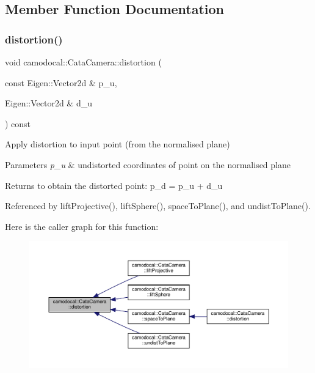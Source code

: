 \subsection{Member Function Documentation}
\mbox{\label{classcamodocal_1_1CataCamera_ade73e1a665f97d5a95d09f0fff19a3f7}} 
\subsubsection{\texorpdfstring{distortion()}{distortion()}\hspace{0.1cm}{\footnotesize\ttfamily [1/2]}}
{\footnotesize\ttfamily void camodocal\+::\+Cata\+Camera\+::distortion (\begin{DoxyParamCaption}\item[{const Eigen\+::\+Vector2d \&}]{p\+\_\+u,  }\item[{Eigen\+::\+Vector2d \&}]{d\+\_\+u }\end{DoxyParamCaption}) const}



Apply distortion to input point (from the normalised plane) 


\begin{DoxyParams}{Parameters}
{\em p\+\_\+u} & undistorted coordinates of point on the normalised plane \\
\hline
\end{DoxyParams}
\begin{DoxyReturn}{Returns}
to obtain the distorted point\+: p\+\_\+d = p\+\_\+u + d\+\_\+u 
\end{DoxyReturn}


Referenced by lift\+Projective(), lift\+Sphere(), space\+To\+Plane(), and undist\+To\+Plane().

Here is the caller graph for this function\+:\nopagebreak
\begin{figure}[H]
\begin{center}
\leavevmode
\includegraphics[width=350pt]{classcamodocal_1_1CataCamera_ade73e1a665f97d5a95d09f0fff19a3f7_icgraph}
\end{center}
\end{figure}
\mbox{\label{classcamodocal_1_1CataCamera_af9f94a9e9109ad71fcabb0f7bc77a18f}} 
